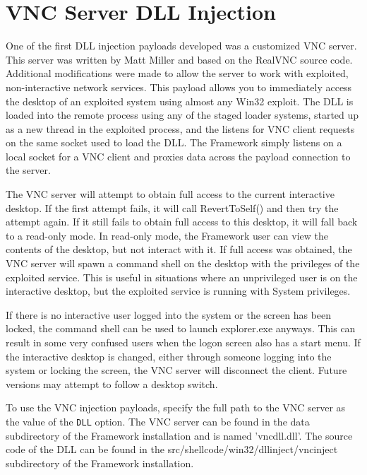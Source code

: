 \documentclass{report}
\begin{document}
\section{VNC Server DLL Injection}
\par
One of the first DLL injection payloads developed was a customized VNC server.
This server was written by Matt Miller and based on the RealVNC source code.
Additional modifications were made to allow the server to work with exploited,
non-interactive network services. This payload allows you to immediately access
the desktop of an exploited system using almost any Win32 exploit. The DLL is
loaded into the remote process using any of the staged loader systems, started
up as a new thread in the exploited process, and the listens for VNC client
requests on the same socket used to load the DLL. The Framework simply listens
on a local socket for a VNC client and proxies data across the payload
connection to the server.  

\par
The VNC server will attempt to obtain full access to the current interactive
desktop. If the first attempt fails, it will call RevertToSelf() and then try
the attempt again. If it still fails to obtain full access to this desktop, it
will fall back to a read-only mode. In read-only mode, the Framework user can
view the contents of the desktop, but not interact with it. If full access was
obtained, the VNC server will spawn a command shell on the desktop with the
privileges of the exploited service. This is useful in situations where an
unprivileged user is on the interactive desktop, but the exploited service is
running with System privileges.  

\par
If there is no interactive user logged into the system or the screen has been
locked, the command shell can be used to launch explorer.exe anyways. This can
result in some very confused users when the logon screen also has a start menu.
If the interactive desktop is changed, either through someone logging into the
system or locking the screen, the VNC server will disconnect the client. Future
versions may attempt to follow a desktop switch. 

\par
To use the VNC injection payloads, specify the full path to the VNC server as
the value of the \texttt{DLL} option. The VNC server can be found in the data
subdirectory of the Framework installation and is named 'vncdll.dll'. The source
code of the DLL can be found in the src/shellcode/win32/dllinject/vncinject
subdirectory of the Framework installation. 
\end{document}
